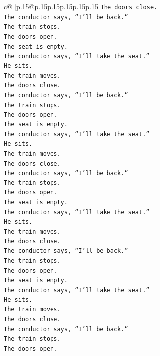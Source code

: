 \documentclass{article}
\begin{document}
{\begin{supertabular}{c@{$\;$}|p{.15\linewidth}@{}p{.15\linewidth}p{.15\linewidth}p{.15\linewidth}p{.15\linewidth}p{.15\linewidth}}
{{{\texttt{The doors close.} \\
\texttt{The conductor says, “I’ll be back.”} \\
\texttt{The train stops.} \\
\texttt{The doors open.} \\
\texttt{The seat is empty.} \\
\texttt{The conductor says, “I’ll take the seat.”} \\
\texttt{He sits.} \\
\texttt{The train moves.} \\
\texttt{The doors close.} \\
\texttt{The conductor says, “I’ll be back.”} \\
\texttt{The train stops.} \\
\texttt{The doors open.} \\
\texttt{The seat is empty.} \\
\texttt{The conductor says, “I’ll take the seat.”} \\
\texttt{He sits.} \\
\texttt{The train moves.} \\
\texttt{The doors close.} \\
\texttt{The conductor says, “I’ll be back.”} \\
\texttt{The train stops.} \\
\texttt{The doors open.} \\
\texttt{The seat is empty.} \\
\texttt{The conductor says, “I’ll take the seat.”} \\
\texttt{He sits.} \\
\texttt{The train moves.} \\
\texttt{The doors close.} \\
\texttt{The conductor says, “I’ll be back.”} \\
\texttt{The train stops.} \\
\texttt{The doors open.} \\
\texttt{The seat is empty.} \\
\texttt{The conductor says, “I’ll take the seat.”} \\
\texttt{He sits.} \\
\texttt{The train moves.} \\
\texttt{The doors close.} \\
\texttt{The conductor says, “I’ll be back.”} \\
\texttt{The train stops.} \\
\texttt{The doors open.} \\
}}}
\end{supertabular}}
\end{document}

